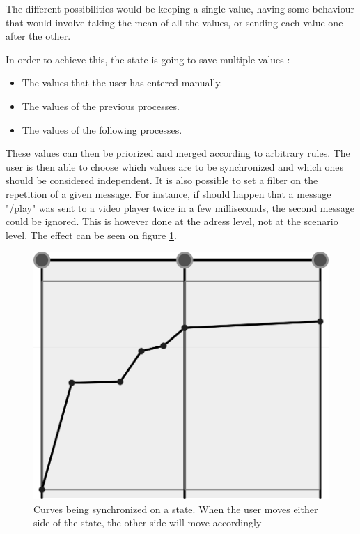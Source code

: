 \documentclass{sigchi}
\begin{document}
The different possibilities would be keeping a single value, having some behaviour that would involve taking the mean of all the values, or sending each value one after the other.

In order to achieve this, the state is going to save multiple values : 
\begin{itemize}
	\item The values that the user has entered manually.
	\item The values of the previous processes.
	\item The values of the following processes.
\end{itemize}

These values can then be priorized and merged according to arbitrary rules. The user is then able to choose which values are to be synchronized and which ones should be considered independent.
It is also possible to set a filter on the repetition of a given message. For instance, if should happen that a message "/play" was sent to a video player twice in a few milliseconds, the second message could be ignored. This is however done at the adress level, not at the scenario level. The effect can be seen on figure \ref{fig.curvesync}. %

\begin{figure}[h]
	\centering
	\includegraphics[scale=0.2]{images/curvesync.png}
	\caption{Curves being synchronized on a state. When the user moves either side of the state, the other side will move accordingly}
	\label{fig.curvesync}
\end{figure}
\end{document}
